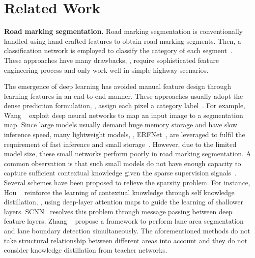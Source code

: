 \documentclass[10pt,twocolumn,letterpaper]{article}
\begin{document}
\section{Related Work}
\label{sec:relatedwork}


\noindent \textbf{Road marking segmentation.} Road marking segmentation is conventionally handled using hand-crafted features to obtain road marking segments. Then, a classification network is employed to classify the category of each segment~\cite{huang2014lane, qin2013general}. These approaches have many drawbacks, \eg, require sophisticated feature engineering process and only work well in simple highway scenarios. 

The emergence of deep learning has avoided manual feature design through learning features in an end-to-end manner. These approaches usually adopt the dense prediction formulation, \ie, assign each pixel a category label~\cite{hou2019learning, pan2017spatial, wang2019apolloscape}. For example, Wang \etal ~\cite{wang2019apolloscape} exploit deep neural networks to map an input image to a segmentation map. Since large models usually demand huge memory storage and have slow inference speed, many lightweight models, \eg, ERFNet~\cite{romera2017erfnet}, are leveraged to fulfil the requirement of fast inference and small storage~\cite{hou2019learning}. However, due to the limited model size, these small networks perform poorly in road marking segmentation. A common observation is that such small models do not have enough capacity to capture sufficient contextual knowledge given the sparse supervision signals~\cite{hou2019learning,pan2017spatial,zhang2018geometric}. Several schemes have been proposed to relieve the sparsity problem. For instance, Hou \etal ~\cite{hou2019learning} reinforce the learning of contextual knowledge through self knowledge distillation, \ie, using deep-layer attention maps to guide the learning of shallower layers. SCNN~\cite{pan2017spatial} resolves this problem through message passing between deep feature layers. Zhang \etal ~\cite{zhang2018geometric} propose a framework to perform lane area segmentation and lane boundary detection simultaneously. 
The aforementioned methods do not take structural relationship between different areas into account and they do not consider knowledge distillation from teacher networks. 
\end{document}
